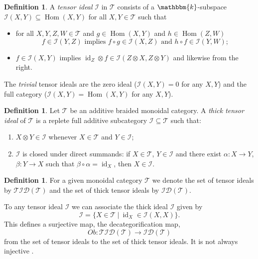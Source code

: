 \documentclass[11pt,a4paper]{amsart}
\theoremstyle{plain}%
\theoremstyle{definition}
\newtheorem{definition}[lemma]{Definition}
\theoremstyle{remark}
\newcommand{\Hom}{\operatorname{Hom}}
\newcommand{\id}{\operatorname{id}}
\newcommand{\kk}{\mathbbm{k}}
\newcommand{\TID}{\mathcal{TID}}
\newcommand{\ID}{\mathcal{ID}}
\newcommand{\I}{\mathcal{I}}
\begin{document}
\begin{definition} A \emph{tensor ideal} $\I$ in $\mathcal{T}$ consists of a {$\kk$-subspace} $\I(X,Y) \subseteq \Hom(X,Y)$ for all $X,Y \in {\mathcal{T}}$ such that 
\begin{itemize} 
\item for all $X,Y,Z,W \in {\mathcal{T}}$ and $g \in \Hom(X,Y)$ and $h \in \Hom(Z,W)$ \[ f \in \I(Y,Z) \text{ implies } f \circ g \in \I(X,Z) \text{ and } h \circ f \in \I(Y,W); \] 
\item $f \in \I(X,Y)$ implies $\id_Z \otimes f \in \I(Z \otimes X,Z \otimes Y)$ and likewise from the right.
\end{itemize}

\end{definition}
The \emph{trivial} tensor ideals are the zero ideal ($\I(X,Y)=0$ for any $X, Y$) and the full category ($\I(X,Y)=\Hom(X, Y)$ for any $X, Y$).
\begin{definition} Let $\mathcal{T}$ be an additive braided monoidal category. A \emph{thick tensor ideal} of ${\mathcal{T}}$ is a replete full additive subcategory $\mathcal{I}\subseteq\mathcal{T}$ such that:
\begin{enumerate}
\item[(i)] $X\otimes Y\in\mathcal{I}$ whenever $X\in\mathcal{T}$ and $Y\in\mathcal{I}$;
\item[(ii)] $\mathcal{I}$ is closed under direct summands: if $X\in{\mathcal{T}}$, $Y\in\mathcal{I}$ and there exist $\alpha:X\to Y$, $\beta:Y\to X$ such that $\beta\circ\alpha=\id_X$, then $X\in\mathcal{I}$.
\end{enumerate}
\end{definition}


\begin{definition} For a given monoidal category $\mathcal{T}$ we denote the set of tensor ideals by $\TID(\mathcal{T})$ and the set of thick tensor ideals by $\ID(\mathcal{T})$.
\end{definition}

To any tensor ideal $\I$ we can associate the thick ideal $\I$ given by \[ \I = \{ X \in \mathcal{T} \ | \ \id_X \in \I(X,X) \}.\] This defines a surjective map, the decategorification map, \[ Ob: \TID(\mathcal{T}) \to \ID(\mathcal{T}) \] from the set of tensor ideals to the set of thick tensor ideals. It is not always injective \cite{Coulembier-ideals}.

\end{document}
